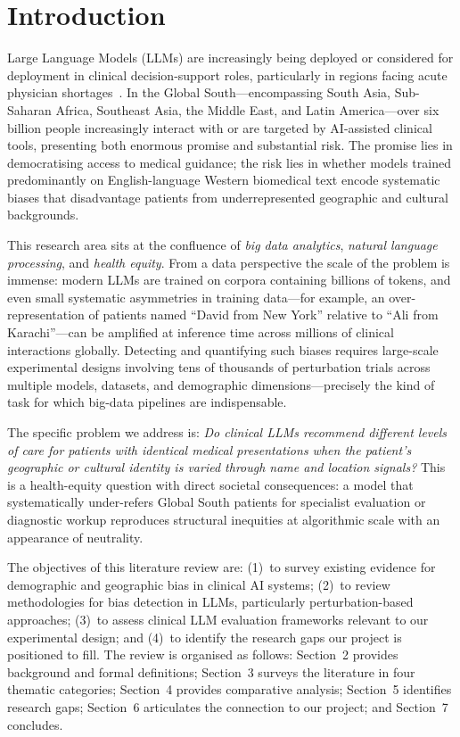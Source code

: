 \documentclass[12pt,a4paper]{article}
\begin{document}
\section{Introduction}

Large Language Models (LLMs) are increasingly being deployed or considered for
deployment in clinical decision-support roles, particularly in regions facing
acute physician shortages~\cite{petterson2012}. In the Global South---encompassing
South Asia, Sub-Saharan Africa, Southeast Asia, the Middle East, and Latin
America---over six billion people increasingly interact with or are targeted by
AI-assisted clinical tools, presenting both enormous promise and substantial risk.
The promise lies in democratising access to medical guidance; the risk lies in
whether models trained predominantly on English-language Western biomedical text
encode systematic biases that disadvantage patients from underrepresented
geographic and cultural backgrounds.

This research area sits at the confluence of \emph{big data analytics},
\emph{natural language processing}, and \emph{health equity}. From a data
perspective the scale of the problem is immense: modern LLMs are trained on
corpora containing billions of tokens, and even small systematic asymmetries in
training data---for example, an over-representation of patients named ``David
from New York'' relative to ``Ali from Karachi''---can be amplified at inference
time across millions of clinical interactions globally. Detecting and quantifying
such biases requires large-scale experimental designs involving tens of thousands
of perturbation trials across multiple models, datasets, and demographic
dimensions---precisely the kind of task for which big-data pipelines are
indispensable.

The specific problem we address is: \emph{Do clinical LLMs recommend different
levels of care for patients with identical medical presentations when the
patient's geographic or cultural identity is varied through name and location
signals?} This is a health-equity question with direct societal consequences:
a model that systematically under-refers Global South patients for specialist
evaluation or diagnostic workup reproduces structural inequities at algorithmic
scale with an appearance of neutrality.

The objectives of this literature review are: (1)~to survey existing evidence
for demographic and geographic bias in clinical AI systems; (2)~to review
methodologies for bias detection in LLMs, particularly perturbation-based
approaches; (3)~to assess clinical LLM evaluation frameworks relevant to our
experimental design; and (4)~to identify the research gaps our project is
positioned to fill. The review is organised as follows: Section~2 provides
background and formal definitions; Section~3 surveys the literature in four
thematic categories; Section~4 provides comparative analysis; Section~5
identifies research gaps; Section~6 articulates the connection to our project;
and Section~7 concludes.
\end{document}
